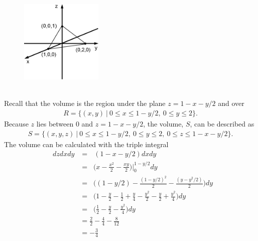 \documentclass{article}
\begin{document}
\BEN
\item %
 \\
\begin{figure}[h]
  \vspace{-1pt}
  \begin{center}
    \includegraphics[width=0.35\textwidth]{TetExample.jpg}
  \end{center}
\end{figure}\\
Recall that the volume is the region under the plane $z = 1 - x - y/2$ and over  
\begin{align*}
  R = \{ (x,y) \ | \ 0 \le x \le 1- y/2, \ 0 \le y \le 2 \}.
\end{align*}
Because $z$ lies between 0 and $z = 1 - x - y/2$, the volume, $S$, can be described as
\begin{align*}
  S = \{ (x,y,z) \ | \ 0 \le x \le 1- y/2, \ 0 \le y \le 2, \ 0 \le z \le 1 - x - y/2 \}.
\end{align*}
The volume can be calculated with the triple integral
\begin{align*}
  \mathop{\int_{0}^{2} \! \int_0^{1-y/2} \int_0^{1-x-y/2} }dzdxdy
  &= \mathop{\int_{0}^{2} \! \int_0^{1-y/2}  } ( 1-x-y/2) dxdy\\
  &= \mathop{\int_{0}^{2}  } \Big( x-\frac{x^2}{2}-\frac{xy}{2}\Big)\Big|_0^{1-y/2} dy \\
  &= \mathop{\int_{0}^{2}  } \Big( (1-y/2)-\frac{(1-y/2)^2}{2}-\frac{(y-y^2/2)}{2}\Big) dy \\
  &= \mathop{\int_{0}^{2}  } \Big( 1 - \frac{y}{2}-\frac{1}{2} + \frac{y}{4} -\frac{y^2}{2}-\frac{y}{2}+\frac{y^2}{4}\Big) dy \\
  &= \mathop{\int_{0}^{2}  } \Big( \frac{1}{2} - \frac{y}{2}  -\frac{y^2}{4} \Big) dy \\
  &= \frac{2}{2} - \frac{4}{4}  -\frac{8}{12} \\
  &=  -\frac{3}{4}
\end{align*} 
\end{document}
